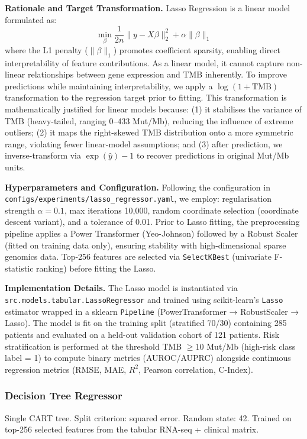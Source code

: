 \documentclass[11pt,a4paper]{article}
\begin{document}
\textbf{Rationale and Target Transformation.} Lasso Regression is a linear model formulated as:
$$\min_{\beta} \frac{1}{2n}\|y - X\beta\|_2^2 + \alpha \|\beta\|_1$$
where the L1 penalty ($\|\beta\|_1$) promotes coefficient sparsity, enabling direct interpretability of feature contributions. As a linear model, it cannot capture non-linear relationships between gene expression and TMB inherently. To improve predictions while maintaining interpretability, we apply a $\log(1+\text{TMB})$ transformation to the regression target prior to fitting. This transformation is mathematically justified for linear models because: (1) it stabilises the variance of TMB (heavy-tailed, ranging 0--433 Mut/Mb), reducing the influence of extreme outliers; (2) it maps the right-skewed TMB distribution onto a more symmetric range, violating fewer linear-model assumptions; and (3) after prediction, we inverse-transform via $\exp(\hat{y}) - 1$ to recover predictions in original Mut/Mb units.

\textbf{Hyperparameters and Configuration.} Following the configuration in \texttt{configs/experiments/lasso\_regressor.yaml}, we employ: regularisation strength $\alpha=0.1$, max iterations 10{,}000, random coordinate selection (coordinate descent variant), and a tolerance of 0.01. Prior to Lasso fitting, the preprocessing pipeline applies a Power Transformer (Yeo-Johnson) followed by a Robust Scaler (fitted on training data only), ensuring stability with high-dimensional sparse genomics data. Top-256 features are selected via \texttt{SelectKBest} (univariate F-statistic ranking) before fitting the Lasso.

\textbf{Implementation Details.} The Lasso model is instantiated via \texttt{src.models.tabular.LassoRegressor} and trained using scikit-learn's \texttt{Lasso} estimator wrapped in a sklearn \texttt{Pipeline} (PowerTransformer → RobustScaler → Lasso). The model is fit on the training split (stratified 70/30) containing 285 patients and evaluated on a held-out validation cohort of 121 patients. Risk stratification is performed at the threshold TMB $\geq 10$ Mut/Mb (high-risk class label = 1) to compute binary metrics (AUROC/AUPRC) alongside continuous regression metrics (RMSE, MAE, $R^2$, Pearson correlation, C-Index).

\subsubsection{Decision Tree Regressor}
Single CART tree. Split criterion: squared error. Random state: 42. Trained on top-256 selected features from the tabular RNA-seq + clinical matrix.
\end{document}
